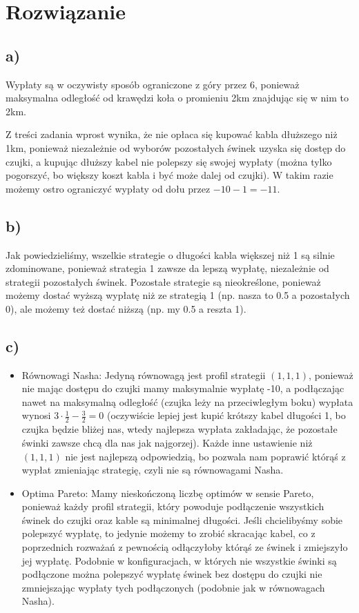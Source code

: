 \documentclass{article}
\begin{document}
\section{Rozwiązanie}

\subsection*{a)}

Wypłaty są w oczywisty sposób ograniczone z góry przez 6, ponieważ maksymalna odległość od krawędzi koła o promieniu 2km znajdując się w nim to 2km.

Z treści zadania wprost wynika, że nie opłaca się kupować kabla dłuższego niż 1km, ponieważ niezależnie od wyborów pozostałych świnek uzyska się dostęp do czujki, a kupując dłuższy kabel nie polepszy się swojej wypłaty (można tylko pogorszyć, bo większy koszt kabla i być może dalej od czujki). W takim razie możemy ostro ograniczyć wypłaty od dołu przez $-10-1 = -11$.

\subsection*{b)}

Jak powiedzieliśmy, wszelkie strategie o długości kabla większej niż 1 są silnie zdominowane, ponieważ strategia 1 zawsze da lepszą wypłatę, niezależnie od strategii pozostałych świnek. Pozostałe strategie są nieokreślone, ponieważ możemy dostać wyższą wypłatę niż ze strategią 1 (np. nasza to 0.5 a pozostałych 0), ale możemy też dostać niższą (np. my 0.5 a reszta 1).

\subsection*{c)}

\begin{itemize}
    \item Równowagi Nasha: Jedyną równowagą jest profil strategii $(1,1,1)$, ponieważ nie mając dostępu do czujki mamy maksymalnie wypłatę -10, a podłączając nawet na maksymalną odległość (czujka leży na przeciwległym boku) wypłata wynosi $3 \cdot \frac{1}{2} - \frac{3}{2} = 0$ (oczywiście lepiej jest kupić krótszy kabel długości 1, bo czujka będzie bliżej nas, wtedy najlepsza wypłata zakładając, że pozostałe świnki zawsze chcą dla nas jak najgorzej). Każde inne ustawienie niż $(1,1,1)$ nie jest najlepszą odpowiedzią, bo pozwala nam poprawić którąś z wypłat zmieniając strategię, czyli nie są równowagami Nasha.
    \item Optima Pareto: Mamy nieskończoną liczbę optimów w sensie Pareto, ponieważ każdy profil strategii, który powoduje podłączenie wszystkich świnek do czujki oraz kable są minimalnej długości. Jeśli chcielibyśmy sobie polepszyć wypłatę, to jedynie możemy to zrobić skracając kabel, co z poprzednich rozważań z pewnością odłączyłoby którąś ze świnek i zmiejszyło jej wypłatę. Podobnie w konfiguracjach, w których nie wszystkie świnki są podłączone można polepszyć wypłatę świnek bez dostępu do czujki nie zmniejszając wypłaty tych podłączonych (podobnie jak w równowagach Nasha).
\end{itemize}
\end{document}
